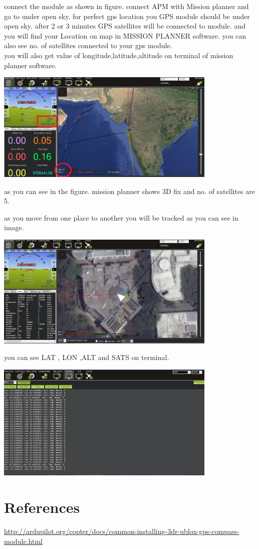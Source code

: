 \documentclass[11pt,a4paper]{article}
\begin{document}
		\vspace{1in}
		connect the module as shown in figure. connect APM with Mission planner and go to under open sky.
		for perfect gps location you GPS module should be under open sky. after 2 or 3 minutes GPS satellites will be connected to module. and you will find your Location on map in MISSION PLANNER software. you can also see no. of satellites connected to your gps module. \\
		
		you will also get value of longitude,latitude,altitude on terminal of mission planner software.\newline
		
		\begin{center}
		\includegraphics[width = 400px]{map1}
		\end{center}
		\hspace{0.5in}
		as you can see in the figure. mission planner shows 3D fix and no. of satellites are 5.
		
		\newpage
		\hspace{0.5in}
		as you move from one place to another you will be tracked as you can see in image.
			\begin{center}
				\includegraphics[width = 400px]{map2}
			\end{center}
	you can see  LAT , LON ,ALT and SATS on terminal.
		\begin{center}
			\includegraphics[width = 400px]{map3}
		\end{center}

	\section{References}
	\url{http://ardupilot.org/copter/docs/common-installing-3dr-ublox-gps-compass-module.html}
	
\end{document}

